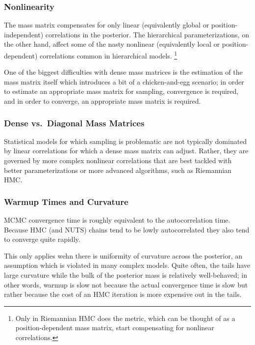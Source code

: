 \subsubsection{Nonlinearity}

The mass matrix compensates for only linear (equivalently global or
position-independent) correlations in the posterior. The hierarchical
parameterizations, on the other hand, affect some of the nasty
nonlinear (equivalently local or position-dependent) correlations
common in hierarchical models.%
%
\footnote{Only in Riemannian HMC does the metric, which can be thought
  of as a position-dependent mass matrix, start compensating for
  nonlinear correlations.}

One of the biggest difficulties with dense mass matrices is the
estimation of the mass matrix itself which introduces a bit of a
chicken-and-egg scenario;  in order to estimate an appropriate mass
matrix for sampling, convergence is required, and in order to
converge, an appropriate mass matrix is required.

\subsubsection{Dense vs.\ Diagonal Mass Matrices}

Statistical models for which sampling is problematic are not typically
dominated by linear correlations for which a dense mass matrix can
adjust.  Rather, they are governed by more complex nonlinear
correlations that are best tackled with better parameterizations or
more advanced algorithms, such as Riemannian HMC.

\subsubsection{Warmup Times and Curvature}

MCMC convergence time is roughly equivalent to the autocorrelation
time.  Because HMC (and NUTS) chains tend to be lowly autocorrelated
they also tend to converge quite rapidly.

This only applies wehn there is uniformity of curvature across the
posterior, an assumption which is violated in many complex models.
Quite often, the tails have large curvature while the bulk of the
posterior mass is relatively well-behaved; in other words, warmup is slow
not because the actual convergence time is slow but rather because the
cost of an HMC iteration is more expensive out in the tails.


